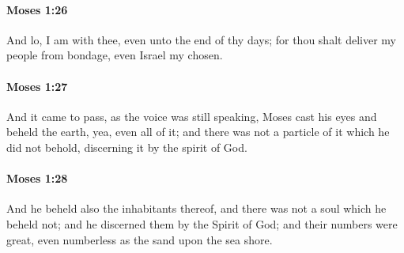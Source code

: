 		\paragraph{Moses 1:26} %
			\label{MOSES-1-26}

			And lo, I am with thee, even unto the end of thy days; for thou shalt deliver my people from bondage, even Israel my chosen.


		\paragraph{Moses 1:27} %
			\label{MOSES-1-27}

			And it came to pass, as the voice was still speaking, Moses cast his eyes and beheld the earth, yea, even all of it; and there was not a particle of it which he did not behold, discerning it by the spirit of God.


		\paragraph{Moses 1:28} %
			\label{MOSES-1-28}

			And he beheld also the inhabitants thereof, and there was not a soul which he beheld not; and he discerned them by the Spirit of God; and their numbers were great, even numberless as the sand upon the sea shore.


